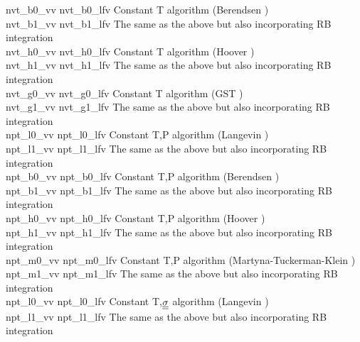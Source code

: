 \begin{tabbing}
{\sc nvt\_b0\_vv}     \> {\sc nvt\_b0\_lfv} \> Constant T algorithm (Berendsen \cite{berendsen-84a}) \\
{\sc nvt\_b1\_vv}     \> {\sc nvt\_b1\_lfv} \> The same as the above but also incorporating RB integration \\
{\sc nvt\_h0\_vv}     \> {\sc nvt\_h0\_lfv} \> Constant T algorithm (Hoover \cite{hoover-85a}) \\
{\sc nvt\_h1\_vv}     \> {\sc nvt\_h1\_lfv} \> The same as the above but also incorporating RB integration \\
{\sc nvt\_g0\_vv}     \> {\sc nvt\_g0\_lfv} \> Constant T algorithm (GST \cite{leimkuhler-09a}) \\
{\sc nvt\_g1\_vv}     \> {\sc nvt\_g1\_lfv} \> The same as the above but also incorporating RB integration \\
{\sc npt\_l0\_vv}     \> {\sc npt\_l0\_lfv} \> Constant T,P algorithm (Langevin \cite{quigley-04a}) \\
{\sc npt\_l1\_vv}     \> {\sc npt\_l1\_lfv} \> The same as the above but also incorporating RB integration \\
{\sc npt\_b0\_vv}     \> {\sc npt\_b0\_lfv} \> Constant T,P algorithm (Berendsen \cite{berendsen-84a}) \\
{\sc npt\_b1\_vv}     \> {\sc npt\_b1\_lfv} \> The same as the above but also incorporating RB integration \\
{\sc npt\_h0\_vv}     \> {\sc npt\_h0\_lfv} \> Constant T,P algorithm (Hoover \cite{hoover-85a}) \\
{\sc npt\_h1\_vv}     \> {\sc npt\_h1\_lfv} \> The same as the above but also incorporating RB integration \\
{\sc npt\_m0\_vv}     \> {\sc npt\_m0\_lfv} \> Constant T,P algorithm (Martyna-Tuckerman-Klein \cite{martyna-96a}) \\
{\sc npt\_m1\_vv}     \> {\sc npt\_m1\_lfv} \> The same as the above but also incorporating RB integration \\
{\sc npt\_l0\_vv}     \> {\sc npt\_l0\_lfv} \> Constant T,$\mbox{$\underline{\underline{\bf \sigma}}$}$ algorithm (Langevin \cite{quigley-04a}) \\
{\sc npt\_l1\_vv}     \> {\sc npt\_l1\_lfv} \> The same as the above but also incorporating RB integration \\

\end{tabbing}
